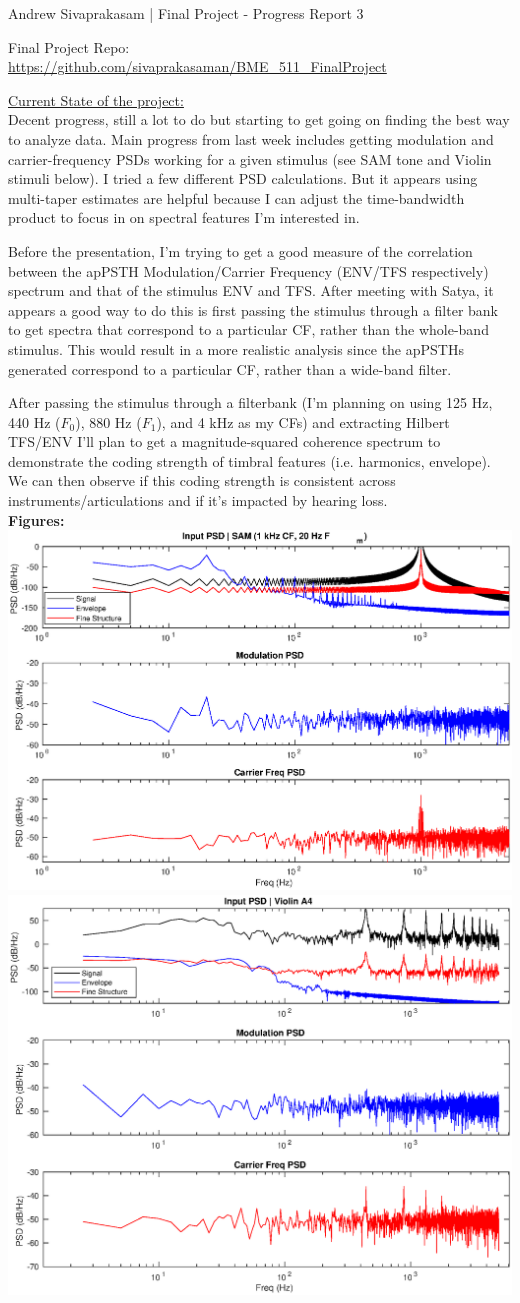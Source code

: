 \documentclass[9pt]{extarticle}
\begin{document}
{\huge Andrew Sivaprakasam | Final Project - Progress Report 3}
\begin{center}
Final Project Repo: \url{https://github.com/sivaprakasaman/BME_511_FinalProject} \\
\end{center} 

\underline{Current State of the project:}\\ 

Decent progress, still a lot to do but starting to get going on finding the best way to analyze data. Main progress from last week includes getting modulation and carrier-frequency PSDs working for a given stimulus (see SAM tone and Violin stimuli below). I tried a few different PSD calculations. But it appears using multi-taper estimates are helpful because I can adjust the time-bandwidth product to focus in on spectral features I'm interested in.

Before the presentation, I'm trying to get a good measure of the correlation between the apPSTH Modulation/Carrier Frequency (ENV/TFS respectively) spectrum and that of the stimulus ENV and TFS. After meeting with Satya, it appears a good way to do this is first passing the stimulus through a filter bank to get spectra that correspond to a particular CF, rather than the whole-band stimulus. This would result in a more realistic analysis since the apPSTHs generated correspond to a particular CF, rather than a wide-band filter. 

After passing the stimulus through a filterbank (I'm planning on using 125 Hz, 440 Hz ($F_0$), 880 Hz ($F_1$), and 4 kHz as my CFs) and extracting Hilbert TFS/ENV I'll plan to get a magnitude-squared coherence spectrum to demonstrate the coding strength of timbral features (i.e. harmonics, envelope). We can then observe if this coding strength is consistent across instruments/articulations and if it's impacted by hearing loss.\\ 

\textbf{Figures:}\\

\centering
\includegraphics[width = .7\textwidth]{SAM_PSD}
\includegraphics[width = .7\textwidth]{Violin_PSD}
\end{document}
